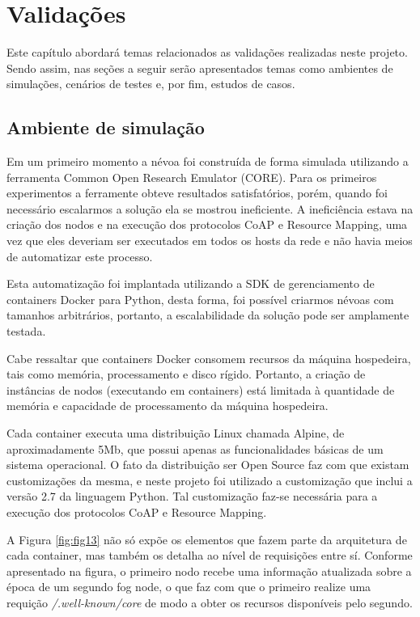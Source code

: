 \chapter{\label{chap:chap4} Validações}


Este capítulo abordará temas relacionados as validações realizadas neste projeto.
Sendo assim, nas seções a seguir serão apresentados temas como ambientes de simulações, cenários de testes e, por fim, estudos de casos.


\section{Ambiente de simulação}

Em um primeiro momento a névoa foi construída de forma simulada utilizando a ferramenta Common Open Research Emulator (CORE)\cite{coregui}.
Para os primeiros experimentos a ferramente obteve resultados satisfatórios, porém, quando foi necessário escalarmos a solução ela se mostrou ineficiente.
A ineficiência estava na criação dos nodos e na execução dos protocolos CoAP e Resource Mapping, uma vez que eles deveriam ser executados em todos os hosts da rede e não havia 
meios de automatizar este processo.

Esta automatização foi implantada utilizando a SDK de gerenciamento de containers Docker para Python, desta forma, foi possível criarmos névoas com tamanhos arbitrários, portanto, a escalabilidade da solução pode ser amplamente testada\cite{dockersdk:2018}.

Cabe ressaltar que containers Docker\cite{docker:2018} consomem recursos da máquina hospedeira, tais como memória, processamento e disco rígido.
Portanto, a criação de instâncias de nodos (executando em containers) está limitada à quantidade de memória e capacidade de processamento da máquina hospedeira.


Cada container executa uma distribuição Linux chamada Alpine, de aproximadamente 5Mb, que possui apenas as funcionalidades básicas de um sistema operacional\cite{linuxalpine:2018}.
O fato da distribuição ser Open Source faz com que existam customizações da mesma, e neste projeto foi utilizado a customização que inclui a versão 2.7 da linguagem Python.
Tal customização faz-se necessária para a execução dos protocolos CoAP e Resource Mapping.


A Figura \ref{fig:fig13} não só expõe os elementos que fazem parte da arquitetura de cada container, mas também os detalha ao nível de requisições entre sí.
Conforme apresentado na figura, o primeiro nodo recebe uma informação atualizada sobre a época de um segundo fog node, o que faz com que o primeiro realize uma requição \textit{/.well-known/core} de modo a obter os recursos disponíveis pelo segundo.

